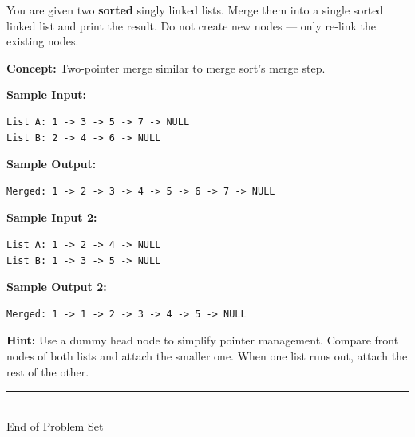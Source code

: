 \documentclass[12pt, a4paper]{article}
\begin{document}
\begin{problembox}
You are given two \textbf{sorted} singly linked lists. Merge them into a single sorted linked list and print the result. Do not create new nodes --- only re-link the existing nodes.
\end{problembox}

\textbf{Concept:} Two-pointer merge similar to merge sort's merge step.

\textbf{Sample Input:}
\begin{lstlisting}
List A: 1 -> 3 -> 5 -> 7 -> NULL
List B: 2 -> 4 -> 6 -> NULL
\end{lstlisting}

\textbf{Sample Output:}
\begin{lstlisting}
Merged: 1 -> 2 -> 3 -> 4 -> 5 -> 6 -> 7 -> NULL
\end{lstlisting}

\textbf{Sample Input 2:}
\begin{lstlisting}
List A: 1 -> 2 -> 4 -> NULL
List B: 1 -> 3 -> 5 -> NULL
\end{lstlisting}

\textbf{Sample Output 2:}
\begin{lstlisting}
Merged: 1 -> 1 -> 2 -> 3 -> 4 -> 5 -> NULL
\end{lstlisting}

\textbf{Hint:} Use a dummy head node to simplify pointer management. Compare front nodes of both lists and attach the smaller one. When one list runs out, attach the rest of the other.

\vspace{1.5cm}
\begin{center}
  \rule{0.5\textwidth}{0.4pt}\\[0.4em]
  {\small End of Problem Set}
\end{center}
\end{document}
